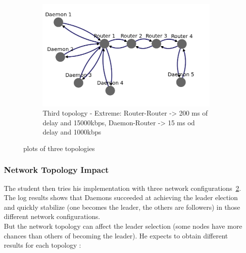 \documentclass{eplmastersthesis}
\begin{document}
\begin{figure}[H]
\begin{subfigure}{0.6\textwidth}
              \includegraphics[width=1.0\linewidth]{figures/user_case/raft_topo_3.png}
              \caption{Third topology - Extreme: Router-Router -> 200 ms of delay and 15000kbps, Daemon-Router -> 15 ms od delay and 1000kbps}
              \label{fig:topo3}
            \end{subfigure}
            \caption{plots of three topologies}
            \label{fig:topologies}
          \end{figure}

        \subsubsection{Network Topology Impact}

          The student then tries his implementation with three network
          configurations~\ref{fig:topologies}.\\
          The log results shows that Daemons succeeded at achieving the leader
          election and quickly stabilize (one becomes the leader, the others
          are followers) in those different network configurations.\\
          But the network topology can affect the leader selection (some nodes
          have more chances than others of becoming the leader). He expects to
          obtain different results for each topology :
\end{document}

